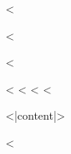 <%

<%
\usepackage{multicol}
\setlength{\columnsep}{1cm}
<%

<%
<%
<%
<%
\begin{multicols}{2}
<|content|>

\printbibliography
\end{multicols}
<%
